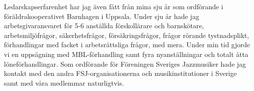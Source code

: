 \documentclass[a4paper]{article}
\begin{document}
Ledarskapserfarenhet har jag även fått från mina sju år som ordförande i föräldrakooperativet Barnhagen i Uppsala. Under sju år hade jag arbetsgivaransvaret för 5-6 anställda förskollärare och barnskötare, arbetsmiljöfrågor, säkerhetsfrågor, försäkringsfrågor, frågor rörande tystnadsplikt, förhandlingar med facket i arbetsrättsliga frågor, med mera. Under min tid gjorde vi en uppsägning med MBL-förhandling samt fyra nyanställningar och totalt åtta löneförhandlingar. Som ordförande för Föreningen Sveriges Jazzmusiker hade jag kontakt med den andra FSJ-organisationerna och musikinstitutioner i Sverige samt med våra medlemmar naturligtvis.

\newpage



% 
% 
\end{document}
